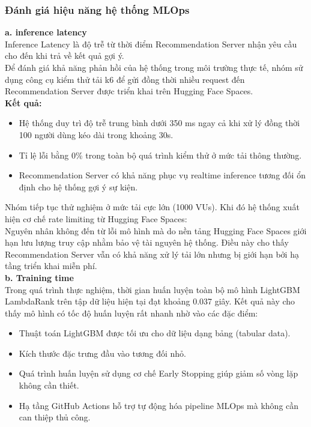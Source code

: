 \subsubsection{Đánh giá hiệu năng hệ thống MLOps}
\textbf{a. inference latency}\\
Inference Latency là độ trễ từ thời điểm Recommendation Server nhận yêu cầu cho đến khi trả về kết quả gợi ý.\\
Để đánh giá khả năng phản hồi của hệ thống trong môi trường thực tế, nhóm sử dụng công cụ kiểm thử tải k6 để gửi đồng thời nhiều request đến Recommendation Server được triển khai trên Hugging Face Spaces.\\
\textbf{Kết quả:}
\begin{itemize}
    \item[-] Hệ thống duy trì độ trễ trung bình dưới 350 ms ngay cả khi xử lý đồng thời 100 người dùng kéo dài trong khoảng 30s.
    \item[-] Tỉ lệ lỗi bằng 0\% trong toàn bộ quá trình kiểm thử ở mức tải thông thường.
    \item[-] Recommendation Server có khả năng phục vụ realtime inference tương đối ổn định cho hệ thống gợi ý sự kiện.
\end{itemize}
Nhóm tiếp tục thử nghiệm ở mức tải cực lớn (1000 VUs). Khi đó hệ thống xuất hiện cơ chế rate limiting từ Hugging Face Spaces:\\
Nguyên nhân không đến từ lỗi mô hình mà do nền tảng Hugging Face Spaces giới hạn lưu lượng truy cập nhằm bảo vệ tài nguyên hệ thống. Điều này cho thấy Recommendation Server vẫn có khả năng xử lý tải lớn nhưng bị giới hạn bởi hạ tầng triển khai miễn phí.\\
\textbf{b. Training time}\\
Trong quá trình thực nghiệm, thời gian huấn luyện toàn bộ mô hình LightGBM LambdaRank trên tập dữ liệu hiện tại đạt khoảng 0.037 giây. Kết quả này cho thấy mô hình có tốc độ huấn luyện rất nhanh nhờ vào các đặc điểm:
\begin{itemize}
    \item[-] Thuật toán LightGBM được tối ưu cho dữ liệu dạng bảng (tabular data).
    \item[-] Kích thước đặc trưng đầu vào tương đối nhỏ.
    \item[-] Quá trình huấn luyện sử dụng cơ chế Early Stopping giúp giảm số vòng lặp không cần thiết.
    \item[-] Hạ tầng GitHub Actions hỗ trợ tự động hóa pipeline MLOps mà không cần can thiệp thủ công.
\end{itemize}
